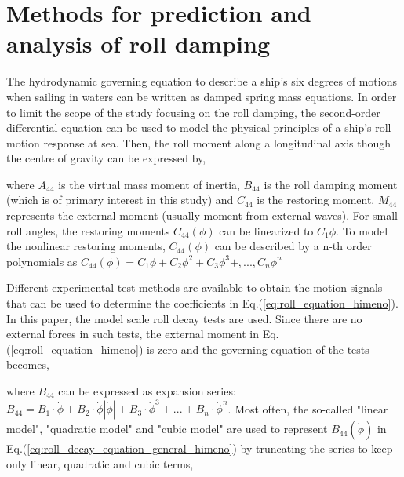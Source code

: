 \section{Methods for prediction and analysis of roll damping}
\label{se:methods_for_prediction_and_analysis}
The hydrodynamic governing equation to describe a ship's six degrees of motions when sailing in waters can be written as damped spring mass equations. In order to limit the scope of the study focusing on the roll damping, the second-order differential equation can be used to model the physical principles of a ship's roll motion response at sea. Then, the roll moment along a longitudinal axis though the centre of gravity can be expressed by,

 

where $A_{44}$ is the virtual mass moment of inertia, $B_{44}$ is the roll damping moment (which is of primary interest in this study) and $C_{44}$ is the restoring moment. $M_{44}$ represents the external moment (usually moment from external waves). For small roll angles, the restoring moments $C_{44}(\phi)$ can be linearized to $C_{1}\phi$. To model the nonlinear restoring moments, $C_{44}(\phi)$ can be described by a n-th order polynomials as $C_{44}(\phi) = C_{1}\phi + C_{2}\phi^2 + C_{3}\phi^3 +, ..., C_{n}\phi^n $

Different experimental test methods are available to obtain the motion signals that can be used to determine the coefficients in Eq.(\ref{eq:roll_equation_himeno}). In this paper, the model scale roll decay tests are used. Since there are no external forces in such tests, the external moment in Eq.(\ref{eq:roll_equation_himeno}) is zero and the governing equation of the tests becomes, 




where $B_{44}$ can be expressed as expansion series:  
$ B_{44} = B_1\cdot\dot{\phi} + B_2\cdot\dot{\phi}\left|\dot{\phi}\right| + B_3\cdot\dot{\phi}^3 + ... + B_n\cdot\dot{\phi}^n$. Most often, the so-called "linear model", "quadratic model" and "cubic model" are used to represent $B_{44}(\dot{\phi})$ in Eq.(\ref{eq:roll_decay_equation_general_himeno}) by truncating the series to keep only linear, quadratic and cubic terms,

